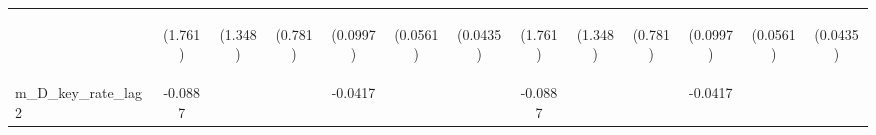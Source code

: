 \documentclass[]{article}
\begin{document}
\begin{center}
\begin{tabular}{lcccccccccccc}
\vspace{4pt} & \begin{footnotesize}(1.761)\end{footnotesize} & \begin{footnotesize}(1.348)\end{footnotesize} & \begin{footnotesize}(0.781)\end{footnotesize} & \begin{footnotesize}(0.0997)\end{footnotesize} & \begin{footnotesize}(0.0561)\end{footnotesize} & \begin{footnotesize}(0.0435)\end{footnotesize} & \begin{footnotesize}(1.761)\end{footnotesize} & \begin{footnotesize}(1.348)\end{footnotesize} & \begin{footnotesize}(0.781)\end{footnotesize} & \begin{footnotesize}(0.0997)\end{footnotesize} & \begin{footnotesize}(0.0561)\end{footnotesize} & \begin{footnotesize}(0.0435)\end{footnotesize} \\
m\_D\_key\_rate\_lag2 & -0.0887 &  &  & -0.0417 &  &  & -0.0887 &  &  & -0.0417 &  &  \\

\end{tabular}
\end{center}
\end{document}
